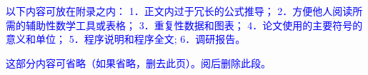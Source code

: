 





\textcolor{blue}{以下内容可放在附录之内：
1．正文内过于冗长的公式推导；
2．方便他人阅读所需的辅助性数学工具或表格；
3．重复性数据和图表；
4．论文使用的主要符号的意义和单位；
5．程序说明和程序全文;
6．调研报告。
}

\textcolor{blue}{这部分内容可省略（如果省略，删去此页）。阅后删除此段。}
